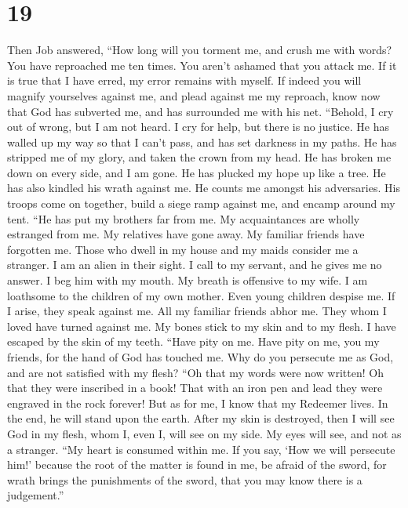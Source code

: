 \hypertarget{section-10}{%
\section{19}\label{section-10}}

 Then Job answered,  ``How long will you torment
me, and crush me with words?  You have reproached me ten
times. You aren't ashamed that you attack me.  If it is true
that I have erred, my error remains with myself.  If indeed
you will magnify yourselves against me, and plead against me my
reproach,  know now that God has subverted me, and has
surrounded me with his net.  ``Behold, I cry out of wrong,
but I am not heard. I cry for help, but there is no justice.
 He has walled up my way so that I can't pass, and has set
darkness in my paths.  He has stripped me of my glory, and
taken the crown from my head.  He has broken me down on
every side, and I am gone. He has plucked my hope up like a tree.
 He has also kindled his wrath against me. He counts me
amongst his adversaries.  His troops come on together,
build a siege ramp against me, and encamp around my tent. 
``He has put my brothers far from me. My acquaintances are wholly
estranged from me.  My relatives have gone away. My
familiar friends have forgotten me.  Those who dwell in my
house and my maids consider me a stranger. I am an alien in their sight.
 I call to my servant, and he gives me no answer. I beg him
with my mouth.  My breath is offensive to my wife. I am
loathsome to the children of my own mother.  Even young
children despise me. If I arise, they speak against me. 
All my familiar friends abhor me. They whom I loved have turned against
me.  My bones stick to my skin and to my flesh. I have
escaped by the skin of my teeth.  ``Have pity on me. Have
pity on me, you my friends, for the hand of God has touched me.
 Why do you persecute me as God, and are not satisfied with
my flesh?  ``Oh that my words were now written! Oh that
they were inscribed in a book!  That with an iron pen and
lead they were engraved in the rock forever!  But as for
me, I know that my Redeemer lives. In the end, he will stand upon the
earth.  After my skin is destroyed, then I will see God in
my flesh,  whom I, even I, will see on my side. My eyes
will see, and not as a stranger. ``My heart is consumed within me.
 If you say, `How we will persecute him!' because the root
of the matter is found in me,  be afraid of the sword, for
wrath brings the punishments of the sword, that you may know there is a
judgement.''

